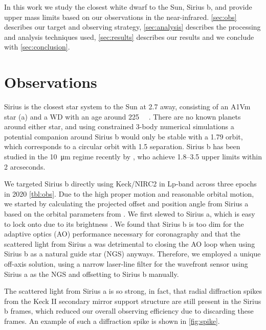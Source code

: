 \documentclass[twocolumn]{aastex631}
\begin{document}
In this work we study the closest white dwarf to the Sun, Sirius b, and provide upper mass limits based on our observations in the near-infrared. \autoref{sec:obs} describes our target and observing strategy, \autoref{sec:analysis} describes the processing and analysis techniques used, \autoref{sec:results} describes our results and we conclude with \autoref{sec:conclusion}.

\section{Observations} \label{sec:obs}

Sirius is the closest star system to the Sun at \SI{2.7}{\parsec} away, consisting of an A1Vm star (a) and a WD with an age around \SI{225}{\mega\year} \citep{bond_sirius_2017,collaboration_gaia_2018}. There are no known planets around either star, and using constrained 3-body numerical simulations a potential companion around Sirius b would only be stable with a \SI{1.79}{\year} orbit, which corresponds to a circular orbit with \SI{1.5}{\au} separation. Sirius b has been studied in the \SI{10}{\micro\meter} regime recently by \cite{pathak_high_2021}, who achieve \SIrange[]{1.8}{3.5}{\mj} upper limits within 2 arcseconds.

We targeted Sirius b directly using Keck/NIRC2 in Lp-band across three epochs in 2020 \autoref{tbl:obs}. Due to the high proper motion and reasonable orbital motion, we started by calculating the projected offset and position angle from Sirius a based on the orbital parameters from \cite{bond_sirius_2017}. We first slewed to Sirius a, which is easy to lock onto due to its brightness \citep[-1.35 K-band magnitude;][]{bonnet-bidaud_adonis_2008}. We found that Sirius b is too dim \citep[9.01 K-band magnitude;][]{bonnet-bidaud_adonis_2008} for the adaptive optics (AO) performance necessary for coronagraphy and that the scattered light from Sirius a was detrimental to closing the AO loop when using Sirius b as a natural guide star (NGS) anyways. Therefore, we employed a unique off-axis solution, using a narrow laser-line filter for the wavefront sensor using Sirius a as the NGS and offsetting to Sirius b manually.

The scattered light from Sirius a is so strong, in fact, that radial diffraction spikes from the Keck II secondary mirror support structure are still present in the Sirius b frames, which reduced our overall observing efficiency due to discarding these frames. An example of such a diffraction spike is shown in \autoref{fig:spike}.
\end{document}
